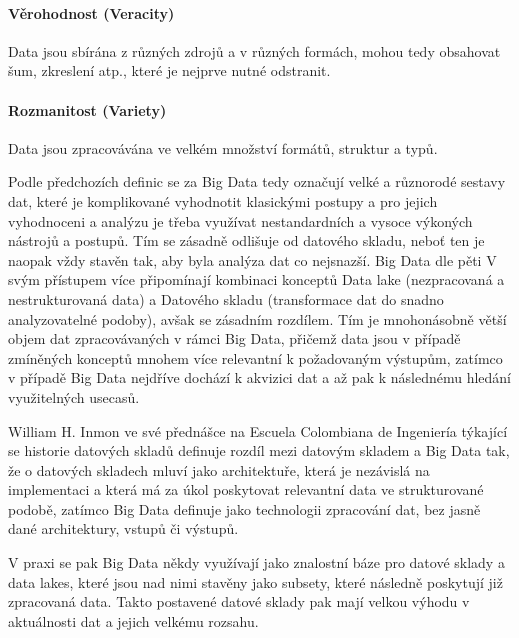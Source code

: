 \documentclass[
  digital,     %
  twoside,     %
  lof,         %
  lot,         %
]{fithesis4}
\begin{document}
\paragraph{Věrohodnost (Veracity)}
Data jsou sbírána z různých zdrojů a v různých formách, mohou tedy obsahovat šum, zkreslení atp., které je nejprve nutné odstranit.

\paragraph{Rozmanitost (Variety)}
Data jsou zpracovávána ve velkém množství formátů, struktur a typů.


Podle předchozích definic se za Big Data tedy označují velké a různorodé sestavy dat, které je komplikované vyhodnotit klasickými postupy a pro jejich vyhodnoceni a analýzu je  třeba využívat nestandardních a vysoce výkoných nástrojů a postupů. Tím se zásadně odlišuje od datového skladu, neboť ten je naopak vždy stavěn tak, aby byla analýza dat co nejsnazší.  Big Data dle pěti V svým přístupem více připomínají kombinaci konceptů Data lake (nezpracovaná a nestrukturovaná data) a Datového skladu (transformace dat do snadno analyzovatelné podoby), avšak se zásadním rozdílem. Tím je mnohonásobně větší objem dat zpracovávaných v rámci Big Data, přičemž data jsou v případě zmíněných konceptů mnohem více relevantní k požadovaným výstupům, zatímco v případě Big Data nejdříve dochází k akvizici dat a až pak k následnému hledání využitelných usecasů.

William H. Inmon ve své přednášce na Escuela Colombiana de Ingeniería týkající se historie datových skladů definuje rozdíl mezi datovým skladem a Big Data tak, že o datových skladech mluví jako architektuře, která je nezávislá na implementaci a která má za úkol poskytovat relevantní data ve strukturované podobě, zatímco Big Data definuje jako technologii zpracování dat, bez jasně dané architektury, vstupů či výstupů. \parencite{Inmon2021}

V praxi se pak Big Data někdy využívají jako znalostní báze pro datové sklady a data lakes, které jsou nad nimi stavěny jako subsety, které následně poskytují již zpracovaná data. Takto postavené datové sklady pak mají velkou výhodu v aktuálnosti dat a jejich velkému rozsahu.
\end{document}
